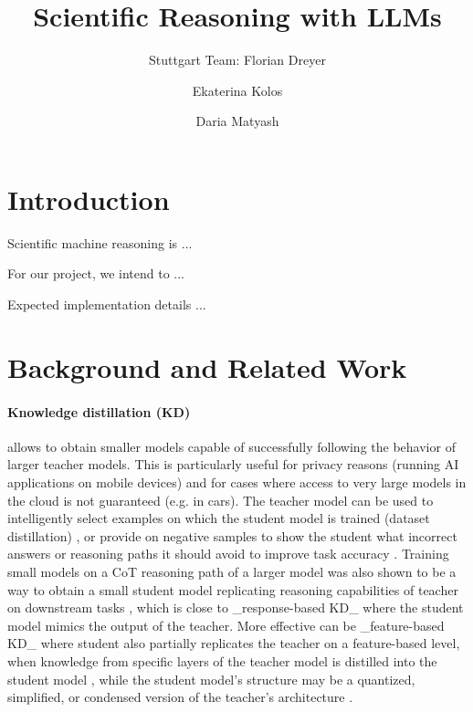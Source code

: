 \documentclass{article}
\begin{document}
\title{Scientific Reasoning with LLMs}

\author{Stuttgart Team: Florian Dreyer \and Ekaterina Kolos \and Daria Matyash}

\maketitle             


\section{Introduction}

Scientific machine reasoning is ... 

For our project, we intend to ...

Expected implementation details ...

\section{Background and Related Work}

\paragraph{Knowledge distillation (KD)} allows to obtain smaller models capable of successfully following the behavior of larger teacher models. This is particularly useful for privacy reasons (running AI applications on mobile devices) and for cases where access to very large models in the cloud is not guaranteed (e.g. in cars). The teacher model can be used to intelligently select examples on which the student model is trained (dataset distillation) \cite{yu2023dataset}, or provide on negative samples to show the student what incorrect answers or reasoning paths it should avoid to improve task accuracy  \cite{li2024turning}. Training small models on a CoT reasoning path of a larger model was also shown to be a way to obtain a small student model replicating reasoning capabilities of teacher on downstream tasks \cite{magister2022teaching}, which is close to _response-based KD_ where the student model mimics the output of the teacher. More effective can be _feature-based KD_ where student also partially replicates the teacher on a feature-based level, when knowledge from specific layers of the teacher model is distilled into the student model \cite{sepahvand2022teacher}, while the student model's structure may be a quantized, simplified, or condensed version of the teacher's architecture \cite{gou2021knowledge}. 
\end{document}
